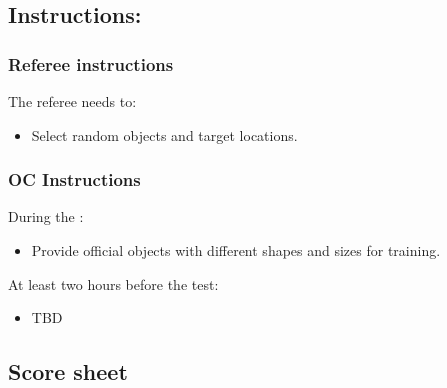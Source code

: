 \subsection*{Instructions:}
\subsubsection*{Referee instructions}

The referee needs to:
\begin{itemize}[nosep]
	\item Select random objects and target locations.
\end{itemize}

\subsubsection*{OC Instructions}
During the \SetupDays:
\begin{itemize}[nosep]
	\item Provide official objects with different shapes and sizes for training.
\end{itemize}
At least two hours before the test:
\begin{itemize}[nosep]
	\item TBD
\end{itemize}

\subsection*{Score sheet}

